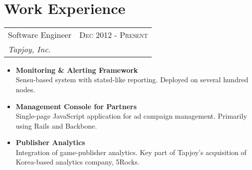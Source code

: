 \documentclass[10pt]{article} %
\begin{document}
\color{text1} %


\par{\\


\begin{minipage}[t]{0.5\textwidth}
\vspace{0pt} %


\section{Work Experience}


\begin{tabularx}{\linewidth}{ X r }
  {\large Software Engineer } & {\textsc{Dec 2012 - Present}} \\
  {\small\textit{Tapjoy, Inc.}}
\end{tabularx}

\begin{itemize}
  \item \textbf{Monitoring \& Alerting Framework} \\
    Sensu-based system with statsd-like reporting. Deployed on several hundred nodes.
  \item \textbf{Management Console for Partners} \\
    Single-page JavaScript application for ad campaign management. Primarily using Rails and Backbone.
  \item \textbf{Publisher Analytics} \\
    Integration of game-publisher analytics. Key part of Tapjoy's acquisition of Korea-based analytics company, 5Rocks.
\end{itemize}


\end{minipage}}
\end{document}
